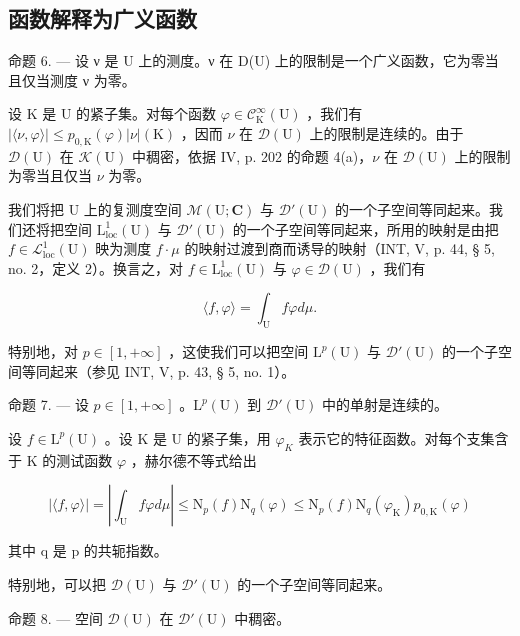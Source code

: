 \subsection{函数解释为广义函数}

命题 6. --- 设 ν 是 U 上的测度。ν 在 D(U) 上的限制是一个广义函数，它为零当且仅当测度 ν 为零。

设 K 是 U 的紧子集。对每个函数 \(\varphi\in\mathcal{C}_{\mathrm{K}}^{\infty}(\mathrm{U})\) ，我们有 \(|\langle\nu,\varphi\rangle|\leqslant p_{0,\mathrm{K}}(\varphi)|\nu|(\mathrm{K})\) ，因而 \(\nu\) 在 \(\mathcal{D}(\mathrm{U})\) 上的限制是连续的。由于 \(\mathcal{D}(\mathrm{U})\) 在 \(\mathcal{K}(\mathrm{U})\) 中稠密，依据 IV, p. 202 的命题 4(a)，\(\nu\) 在 \(\mathcal{D}(\mathrm{U})\) 上的限制为零当且仅当 \(\nu\) 为零。

我们将把 U 上的复测度空间 \(\mathcal{M}(\mathrm{U};\mathbf{C})\) 与 \(\mathcal{D}'(\mathrm{U})\) 的一个子空间等同起来。我们还将把空间 \(\mathrm{L}_{\mathrm{loc}}^{1}(\mathrm{U})\) 与 \(\mathcal{D}'(\mathrm{U})\) 的一个子空间等同起来，所用的映射是由把 \(f\in \mathcal{L}_{\mathrm{loc}}^{1}(\mathrm{U})\) 映为测度 \(f\cdot \mu\) 的映射过渡到商而诱导的映射（INT, V, p. 44, § 5, no. 2，定义 2）。换言之，对 \(f\in \mathrm{L}_{\mathrm{loc}}^{1}(\mathrm{U})\) 与 \(\varphi \in \mathcal{D}(\mathrm{U})\) ，我们有

\[
\langle f, \varphi \rangle = \int_ {\mathrm{U}} f \varphi d \mu .
\]

特别地，对 \(p \in [1, +\infty]\) ，这使我们可以把空间 \(\mathrm{L}^p(\mathrm{U})\) 与 \(\mathcal{D}'(\mathrm{U})\) 的一个子空间等同起来（参见 INT, V, p. 43, § 5, no. 1）。

命题 7. --- 设 \(p \in [1, +\infty]\) 。\(\mathrm{L}^p(\mathrm{U})\) 到 \(\mathcal{D}'(\mathrm{U})\) 中的单射是连续的。

设 \(f \in \mathrm{L}^{p}(\mathrm{U})\) 。设 K 是 U 的紧子集，用 \(\varphi_{K}\) 表示它的特征函数。对每个支集含于 K 的测试函数 \(\varphi\) ，赫尔德不等式给出

\[
| \langle f, \varphi \rangle | = \left| \int_ {\mathrm{U}} f \varphi d \mu \right| \leqslant \mathrm{N} _ {p} (f) \mathrm{N} _ {q} (\varphi) \leqslant \mathrm{N} _ {p} (f) \mathrm{N} _ {q} (\varphi_ {\mathrm{K}}) p _ {0, \mathrm{K}} (\varphi)
\]

其中 q 是 p 的共轭指数。

特别地，可以把 \(\mathcal{D}(\mathrm{U})\) 与 \(\mathcal{D}'(\mathrm{U})\) 的一个子空间等同起来。

命题 8. --- 空间 \(\mathcal{D}(\mathrm{U})\) 在 \(\mathcal{D}'(\mathrm{U})\) 中稠密。

